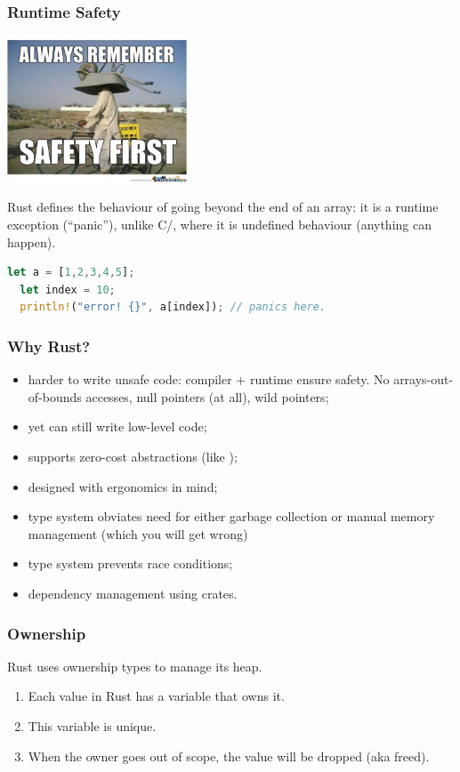 \begin{frame}[fragile]
\frametitle{Runtime Safety}

\begin{center}
	\includegraphics[width=0.4\textwidth]{images/safetyfirst.jpg}
\end{center}

Rust defines
the behaviour of going beyond the end of an array: it is a runtime exception (``panic''),
unlike C/\CPP, where it is undefined behaviour (anything can happen).

\begin{lstlisting}[language=Rust]
  let a = [1,2,3,4,5];
  let index = 10;
  println!("error! {}", a[index]); // panics here.
\end{lstlisting}

\end{frame}

\begin{frame}
\frametitle{Why Rust?}

\begin{itemize}
\item harder to write unsafe code: compiler + runtime ensure safety. No arrays-out-of-bounds accesses, null pointers (at all), wild pointers;
\item yet can still write low-level code;
\item supports zero-cost abstractions (like \CPP);
\item designed with ergonomics in mind;
\item type system obviates need for either garbage collection or manual memory management (which you will get wrong)
\item type system prevents race conditions;
\item dependency management using crates.
\end{itemize}


\end{frame}


\begin{frame}
\frametitle{Ownership}
Rust uses ownership types to manage its heap. 

\begin{enumerate}[noitemsep]
\item Each value in Rust has a variable that \alert{owns} it.
\item This variable is \alert{unique}.
\item When the owner goes out of scope, the value will be dropped (aka freed).
\end{enumerate}


\end{frame}


